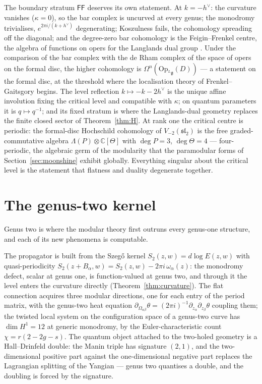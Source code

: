 \documentclass[11pt]{amsart}
\numberwithin{equation}{section}
\theoremstyle{plain}
\theoremstyle{definition}
\theoremstyle{remark}
\newcommand{\bC}{\mathbb{C}}
\newcommand{\fg}{\mathfrak{g}}
\newcommand{\dvee}{h^{\vee}}
\begin{document}
The boundary stratum $\mathsf{FF}$ deserves its own statement. At
$k=-\dvee$: the curvature vanishes ($\kappa=0$), so the bar complex is
uncurved at every genus; the monodromy trivialises,
$e^{2\pi i/(k+\dvee)}$ degenerating; Koszulness fails, the cohomology
spreading off the diagonal; and the degree-zero bar cohomology is the
Feigin--Frenkel centre, the algebra of functions on opers for the
Langlands dual group \cite{FF}. Under the comparison of the bar
complex with the de Rham complex of the space of opers on the formal
disc, the higher cohomology is $\Omega^{n}(\mathrm{Op}_{{}^{L}\fg}(D))$
--- a statement on the formal disc, at the threshold where the
localisation theory of Frenkel--Gaitsgory begins. The level reflection $k\mapsto-k-2\dvee$ is the unique
affine involution fixing the critical level and compatible with
$\kappa$; on quantum parameters it is $q\mapsto q^{-1}$; and its fixed
stratum is where the Langlands-dual geometry replaces the finite
closed sector of Theorem~\ref{thm:H}. At rank one the critical centre is periodic: the formal-disc
Hochschild cohomology of $V_{-2}(\mathfrak{sl}_2)$ is the free
graded-commutative algebra $\Lambda(P)\otimes\bC[\Theta]$ with
$\deg P=3$, $\deg\Theta=4$ --- four-periodic, the algebraic germ of
the modularity that the paramodular forms of
Section~\ref{sec:moonshine} exhibit globally. Everything singular
about the critical level is the statement that flatness and duality
degenerate together.

\section{The genus-two kernel}\label{sec:genus-two}

Genus two is where the modular theory first outruns every genus-one
structure, and each of its new phenomena is computable.

The propagator is built from the Szeg\H{o} kernel
$S_2(z,w)=d\log E(z,w)$ with quasi-periodicity
$S_2(z+B_\alpha,w)=S_2(z,w)-2\pi i\,\omega_\alpha(z)$: the monodromy
defect, scalar at genus one, is function-valued at genus two, and
through it the level enters the curvature directly
(Theorem~\ref{thm:curvature}). The flat connection acquires three
modular directions, one for each entry of the period matrix, with the
genus-two heat equation
$\partial_{\Omega_{\alpha\beta}}\theta=(2\pi i)^{-1}
\partial_{z_\alpha}\partial_{z_\beta}\theta$ coupling them; the
twisted local system on the configuration space of a genus-two curve
has $\dim H^{1}=12$ at generic monodromy, by the Euler-characteristic
count $\chi=r(2-2g-s)$. The quantum object attached to the
two-holed geometry is a Hall--Drinfeld double: the Manin triple has
signature $(2,1)$, and the two-dimensional positive part against the
one-dimensional negative part replaces the Lagrangian splitting of the
Yangian --- genus two quantises a double, and the doubling is forced
by the signature.
\end{document}
